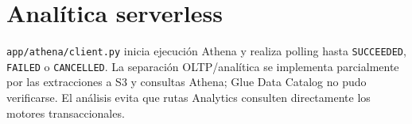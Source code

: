 \chapter{Analítica serverless}\texttt{app/athena/client.py} inicia ejecución Athena y realiza polling hasta \texttt{SUCCEEDED}, \texttt{FAILED} o \texttt{CANCELLED}. La separación OLTP/analítica se implementa parcialmente por las extracciones a S3 y consultas Athena; Glue Data Catalog no pudo verificarse. El análisis evita que rutas Analytics consulten directamente los motores transaccionales.
